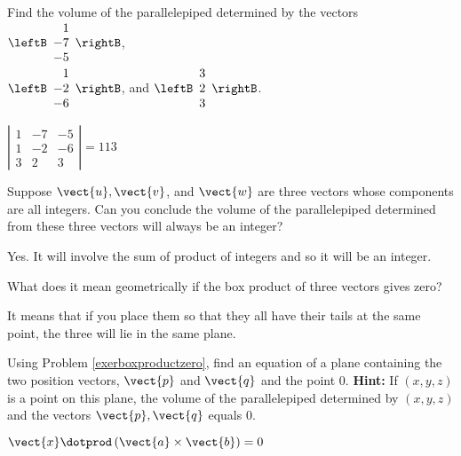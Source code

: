 \begin{enumialphparenastyle}

\begin{ex} Find the volume of the parallelepiped determined by the vectors
$\leftB
\begin{array}{r}
1 \\
-7 \\
-5
\end{array}
\rightB $, \\
 $\leftB
\begin{array}{r}
1 \\
-2 \\
-6
\end{array}
\rightB$, and $\leftB
\begin{array}{r}
3 \\
2 \\
3
\end{array}
\rightB$.
\begin{sol}
 $\left\vert
\begin{array}{rrr}
1 & -7 & -5 \\
1 & -2 & -6 \\
3 & 2 & 3
\end{array}
\right\vert = 113$
\end{sol}
\end{ex}

\begin{ex} Suppose $\vect{u},\vect{v}$, and $\vect{w}$ are three vectors whose
components are all integers. Can you conclude the volume of the
parallelepiped determined from these three vectors will always be an integer?
\begin{sol}
Yes. It will involve the sum of product of integers and so it will
be an integer.
\end{sol}
\end{ex}

\begin{ex} \label{exerboxproductzero} What does it mean geometrically if the box
product of three vectors gives zero?
\begin{sol}
It means that if you place them so that
they all have their tails at the same point, the three will lie in the same
plane.
\end{sol}
\end{ex}

\begin{ex} Using Problem \ref{exerboxproductzero}, find an equation of a plane
containing the two position vectors, $\vect{p}$ and $\vect{q}$ and the
point $0$. 
\textbf{Hint: }If $\left( x,y,z\right) $ is a point on
this plane, the volume of the parallelepiped determined by $\left(
x,y,z\right) $ and the vectors $\vect{p},\vect{q}$ equals 0.
\begin{sol}
$\vect{x}\dotprod \left( \vect{a}\times \vect{b}\right) =0$
\end{sol}
\end{ex}


\end{enumialphparenastyle}
